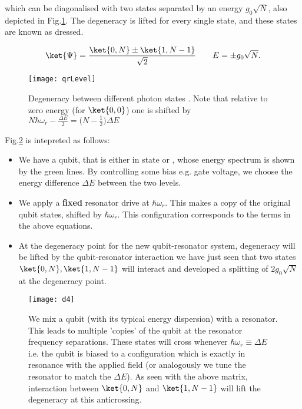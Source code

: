 \noindent  which can  be diagonalised  with two  states separated  by an
energy  $  g_0\sqrt{N}  $,  also  depicted  in  Fig.\ref{qrLevel}.   The
degeneracy is lifted for every single  state, and these states are known
as dressed.

\begin{equation}
  \ket{\Psi} = \frac{\ket{0,N}\pm\ket{1,N-1}}{\sqrt{2}} \qquad E = \pm{g_0\sqrt{N}}.
\end{equation}

\begin{figure}
  \texttt{[image: qrLevel]}
  \caption{Degeneracy between  different photon  states \label{qrLevel}.
    Note that relative to zero energy (for $ \ket{0,0} $) one is shifted
    by $ N\hbar\omega_r-\frac{\Delta E}{2}=\bigg(N-\frac{1}{2}\bigg)\Delta E $}
\end{figure}

Fig.\ref{qrDresssed} is intepreted as follows:

\begin{itemize}
\item We  have a qubit,  that is either  in state   or ,
  whose energy  spectrum is  shown by the  green lines.   By controlling
  some  bias  e.g.   gate  voltage,  we  choose  the  energy  difference
  $ \Delta E $ between the two levels.
\item We  apply a \textbf{fixed}  resonator drive at $  \hbar\omega_r $.
  This  makes  a   copy  of  the  original  qubit   states,  shifted  by
  $ \hbar\omega_r $.  This  configuration corresponds to the 
  terms in the above equations.
\item  At  the degeneracy  point  for  the new  qubit-resonator  system,
  degeneracy will be  lifted by the qubit-resonator  interaction \ira we
  have  just  seen that  two  states  $  \ket{0,N}, \ket{1,N-1}  $  will
  interact  and  developed  a  splitting  of $  2g_0\sqrt{N}  $  at  the
  degeneracy point.  
\end{itemize}

\begin{figure}[h]
  \centering%
  \texttt{[image: d4]}
  \caption{We mix  a qubit (with  its typical energy dispersion)  with a
    resonator.   This leads  to multiple  'copies' of  the qubit  at the
    resonator frequency  separations.  These states will  cross whenever
    $  \hbar\omega_r\equiv\Delta E  $ i.e.   the  qubit is  biased to  a
    configuration which is  exactly in resonance with  the applied field
    (or analogously  we tune the  resonator to match the  $ \Delta E  $).  As
    seen  with the  above  matrix, interaction  between $\ket{0,N}$  and
    $    \ket{1,N-1}   $    will   lift    the   degeneracy    at   this
    anticrossing.\label{qrDresssed}}
\end{figure}

